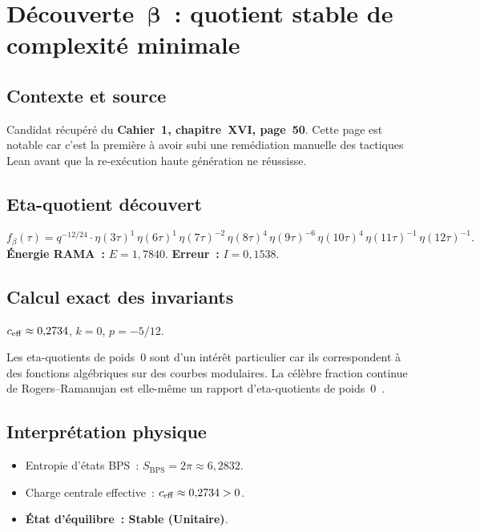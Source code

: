 \section{Découverte~$\boldsymbol{\beta}$~: quotient stable de complexité minimale}
\label{sec:beta}

\subsection{Contexte et source}
Candidat récupéré du \textbf{Cahier~1, chapitre~XVI, page~50}. Cette page est notable car c'est la première à avoir subi une remédiation manuelle des tactiques Lean avant que la re-exécution haute génération ne réussisse.

\subsection{Eta-quotient découvert}
\begin{equation}
  f_\beta(\tau) = q^{-12/24} \cdot \eta(3\tau)^{1} \, \eta(6\tau)^{1} \, \eta(7\tau)^{-2} \, \eta(8\tau)^{4} \, \eta(9\tau)^{-6} \, \eta(10\tau)^{4} \, \eta(11\tau)^{-1} \, \eta(12\tau)^{-1}.
\end{equation}
\textbf{Énergie RAMA~:} $E = 1{,}7840$. \quad \textbf{Erreur~:} $I = 0{,}1538$.

\subsection{Calcul exact des invariants}
\begin{proposition}
$c_{\mathrm{eff}} \approx 0{,}2734$, $k = 0$, $p = -5/12$.
\end{proposition}

\begin{remark}[Signification de $k=0$]
Les eta-quotients de poids~0 sont d'un intérêt particulier car ils correspondent à des fonctions algébriques sur des courbes modulaires. La célèbre fraction continue de Rogers--Ramanujan est elle-même un rapport d'eta-quotients de poids~0~\cite{andrews_berndt_I}.
\end{remark}

\subsection{Interprétation physique}
\begin{itemize}
  \item Entropie d'états BPS~: $S_{\mathrm{BPS}} = 2\pi \approx 6{,}2832$.
  \item Charge centrale effective~: $c_{\mathrm{eff}} \approx 0{,}2734 > 0$.
  \item \textbf{État d'équilibre~: Stable (Unitaire)}.
\end{itemize}
